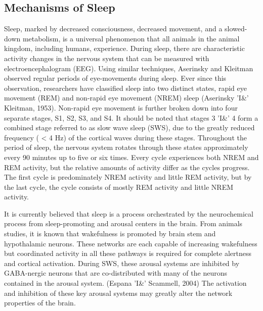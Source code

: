 \documentclass[11pt,letterpaper,doublespacing,titlepage]{article}
\begin{document}
\subsection{Mechanisms of Sleep}
\par
Sleep, marked by decreased consciousness, decreased movement, and a slowed-down metabolism, is a universal phenomenon that all animals in the animal kingdom, including humans, experience. During sleep, there are characteristic activity changes in the nervous system that can be measured with electroencephalogram (EEG). Using similar techniques, Aserinsky and Kleitman observed regular periods of eye-movements during sleep. Ever since this observation, researchers have classified sleep into two distinct states, rapid eye movement (REM) and non-rapid eye movement (NREM) sleep (Aserinsky 'I\&' Kleitman, 1953). Non-rapid eye movement is further broken down into four separate stages, S1, S2, S3, and S4. It should be noted that stages 3  'I\&' 4 form a combined stage referred to as slow wave sleep (SWS), due to the greatly reduced frequency ( < 4 Hz) of the cortical waves during these stages. Throughout the period of sleep, the nervous system rotates through these states approximately every 90 minutes up to five or six times. Every cycle experiences both NREM and REM activity, but the relative amounts of activity differ as the cycles progress. The first cycle is predominately NREM activity and little REM activity, but by the last cycle, the cycle consists of mostly REM activity and little NREM activity.
\par
It is currently believed that sleep is a process orchestrated by the neurochemical process from sleep-promoting and arousal centers in the brain. From animals studies, it is known that wakefulness is promoted by brain stem and hypothalamic neurons. These networks are each capable of increasing wakefulness but coordinated activity in all these pathways is required for complete alertness and cortical activation. During SWS, these arousal systems are inhibited by GABA-nergic neurons that are co-distributed with many of the neurons contained in the arousal system. (Espana 'I\&' Scammell, 2004) The activation and inhibition of these key arousal systems may greatly alter the network properties of the brain.
\end{document}

